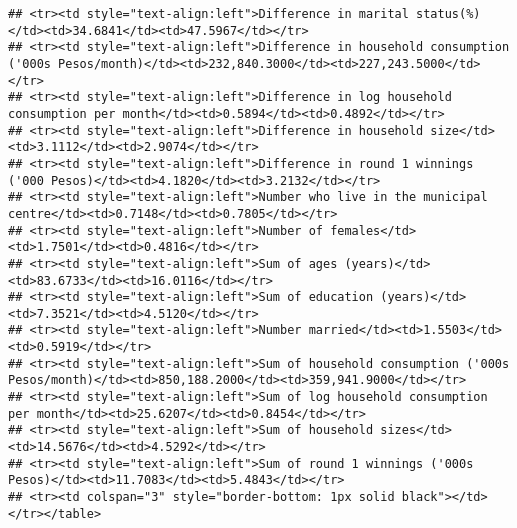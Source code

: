 \documentclass[]{article}
\begin{document}
\begin{verbatim}
## <tr><td style="text-align:left">Difference in marital status(%)</td><td>34.6841</td><td>47.5967</td></tr>
## <tr><td style="text-align:left">Difference in household consumption ('000s Pesos/month)</td><td>232,840.3000</td><td>227,243.5000</td></tr>
## <tr><td style="text-align:left">Difference in log household consumption per month</td><td>0.5894</td><td>0.4892</td></tr>
## <tr><td style="text-align:left">Difference in household size</td><td>3.1112</td><td>2.9074</td></tr>
## <tr><td style="text-align:left">Difference in round 1 winnings ('000 Pesos)</td><td>4.1820</td><td>3.2132</td></tr>
## <tr><td style="text-align:left">Number who live in the municipal centre</td><td>0.7148</td><td>0.7805</td></tr>
## <tr><td style="text-align:left">Number of females</td><td>1.7501</td><td>0.4816</td></tr>
## <tr><td style="text-align:left">Sum of ages (years)</td><td>83.6733</td><td>16.0116</td></tr>
## <tr><td style="text-align:left">Sum of education (years)</td><td>7.3521</td><td>4.5120</td></tr>
## <tr><td style="text-align:left">Number married</td><td>1.5503</td><td>0.5919</td></tr>
## <tr><td style="text-align:left">Sum of household consumption ('000s Pesos/month)</td><td>850,188.2000</td><td>359,941.9000</td></tr>
## <tr><td style="text-align:left">Sum of log household consumption per month</td><td>25.6207</td><td>0.8454</td></tr>
## <tr><td style="text-align:left">Sum of household sizes</td><td>14.5676</td><td>4.5292</td></tr>
## <tr><td style="text-align:left">Sum of round 1 winnings ('000s Pesos)</td><td>11.7083</td><td>5.4843</td></tr>
## <tr><td colspan="3" style="border-bottom: 1px solid black"></td></tr></table>
\end{verbatim}
\end{document}
